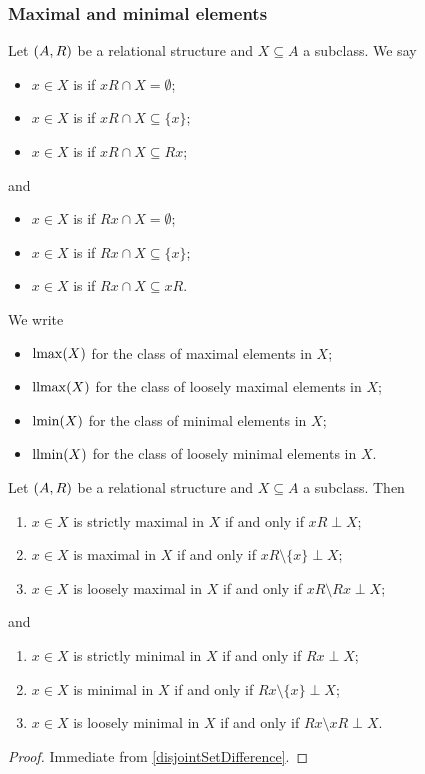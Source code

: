 \subsubsection{Maximal and minimal elements}
\begin{definition}
Let $\sSet{A, R}$ be a relational structure and $X\subseteq A$ a subclass. We say
\begin{itemize}
\item $x\in X$ is  if $xR\cap X = \emptyset$;
\item $x\in X$ is  if $xR\cap X \subseteq \{x\}$;
\item $x\in X$ is  if $xR\cap X \subseteq Rx$;
\end{itemize}
and
\begin{itemize}
\item $x\in X$ is  if $Rx\cap X = \emptyset$;
\item $x\in X$ is  if $Rx\cap X \subseteq \{x\}$;
\item $x\in X$ is  if $Rx\cap X \subseteq xR$.
\end{itemize}
We write
\begin{itemize}
\item $\operatorname{lmax}(X)$ for the class of maximal elements in $X$;
\item $\operatorname{llmax}(X)$ for the class of loosely maximal elements in $X$;
\item $\operatorname{lmin}(X)$ for the class of minimal elements in $X$;
\item $\operatorname{llmin}(X)$ for the class of loosely minimal elements in $X$.
\end{itemize}
\end{definition}

\begin{lemma} \label{maximalMinimalEquivalents}
Let $\sSet{A, R}$ be a relational structure and $X\subseteq A$ a subclass. Then
\begin{enumerate}
\item $x\in X$ is strictly maximal in $X$ \textup{if and only if} $xR \perp X$;
\item $x\in X$ is maximal in $X$ \textup{if and only if} $xR\setminus\{x\} \perp X$;
\item $x\in X$ is loosely maximal in $X$ \textup{if and only if} $xR\setminus Rx \perp X$;
\end{enumerate}
and
\begin{enumerate}
\item $x\in X$ is strictly minimal in $X$ \textup{if and only if} $Rx \perp X$;
\item $x\in X$ is minimal in $X$ \textup{if and only if} $Rx\setminus\{x\} \perp X$;
\item $x\in X$ is loosely minimal in $X$ \textup{if and only if} $Rx\setminus xR \perp X$.
\end{enumerate}
\end{lemma}
\begin{proof}
Immediate from \ref{disjointSetDifference}.
\end{proof}

